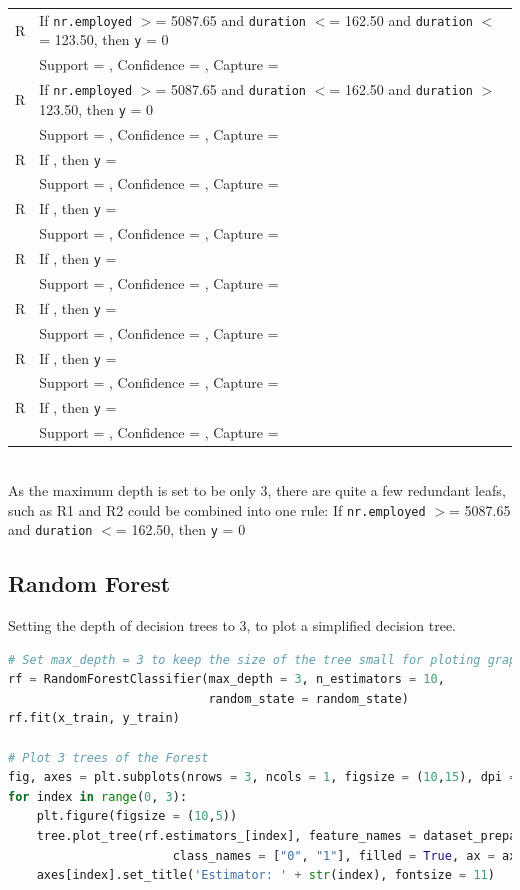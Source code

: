 \documentclass[11pt,a4paper]{article}
\newcounter{magicrownumbers}
\begin{document}
    \setcounter{magicrownumbers}{0}
    \newcommand\rules{\stepcounter{magicrownumbers}\arabic{magicrownumbers}}
    \begin{tabular}{r l}
        R\rules & If \texttt{nr.employed} $>$= 5087.65 and \texttt{duration} $<$= 162.50 and \texttt{duration} $<$= 123.50, then \texttt{y} = 0 \\
        & Support = , Confidence = , Capture = \\
        R\rules & If \texttt{nr.employed} $>$= 5087.65 and \texttt{duration} $<$= 162.50 and \texttt{duration} $>$ 123.50, then \texttt{y} = 0 \\
        & Support = , Confidence = , Capture = \\
        R\rules & If , then \texttt{y} =  \\
        & Support = , Confidence = , Capture = \\
        R\rules & If , then \texttt{y} =  \\
        & Support = , Confidence = , Capture = \\
        R\rules & If , then \texttt{y} =  \\
        & Support = , Confidence = , Capture = \\
        R\rules & If , then \texttt{y} =  \\
        & Support = , Confidence = , Capture = \\
        R\rules & If , then \texttt{y} =  \\
        & Support = , Confidence = , Capture = \\
        R\rules & If , then \texttt{y} =  \\
        & Support = , Confidence = , Capture = \\
        
    \end{tabular} \\
    As the maximum depth is set to be only 3, there are quite a few redundant leafs, such as R1 and R2 could be combined into one rule: If \texttt{nr.employed} $>$= 5087.65 and \texttt{duration} $<$= 162.50, then \texttt{y} = 0
    
    \subsection{Random Forest} \label{random_forest}
    Setting the depth of decision trees to 3, to plot a simplified decision tree.
\begin{lstlisting}[language = Python]
# Set max_depth = 3 to keep the size of the tree small for ploting graph
rf = RandomForestClassifier(max_depth = 3, n_estimators = 10,
                            random_state = random_state)
rf.fit(x_train, y_train)

# Plot 3 trees of the Forest
fig, axes = plt.subplots(nrows = 3, ncols = 1, figsize = (10,15), dpi = 100)
for index in range(0, 3):
    plt.figure(figsize = (10,5))
    tree.plot_tree(rf.estimators_[index], feature_names = dataset_prepared.columns,
                       class_names = ["0", "1"], filled = True, ax = axes[index])
    axes[index].set_title('Estimator: ' + str(index), fontsize = 11)
\end{lstlisting}
\end{document}
